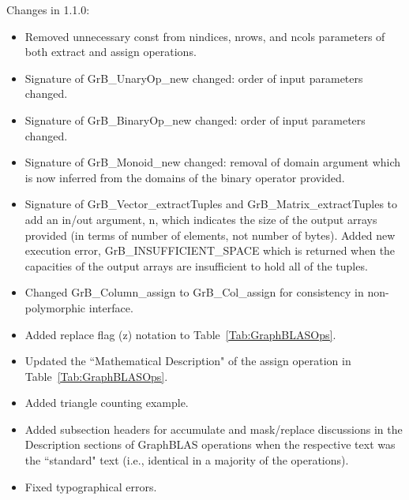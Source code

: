 Changes in 1.1.0:
\begin{itemize}
\item Removed unnecessary {\sf const} from {\sf nindices}, {\sf nrows}, and {\sf ncols} parameters of both {\sf extract} and {\sf assign} operations.
\item Signature of {\sf GrB\_UnaryOp\_new} changed: order of input parameters changed.
\item Signature of {\sf GrB\_BinaryOp\_new} changed: order of input parameters changed.
\item Signature of {\sf GrB\_Monoid\_new} changed: removal of domain argument which is now inferred from the domains of the binary operator provided.
\item Signature of {\sf GrB\_Vector\_extractTuples} and {\sf GrB\_Matrix\_extractTuples} to add an in/out argument, {\sf n}, which indicates the size of the output arrays provided (in terms of number of elements, not number of bytes).  Added new execution error, {\sf GrB\_INSUFFICIENT\_SPACE} which is returned when the capacities of the output arrays are insufficient to hold all of the tuples.
\item Changed {\sf GrB\_Column\_assign} to {\sf GrB\_Col\_assign} for consistency in non-polymorphic interface.
\item Added replace flag (z) notation to Table~\ref{Tab:GraphBLASOps}.
\item Updated the ``Mathematical Description" of the assign operation in Table~\ref{Tab:GraphBLASOps}.
\item Added triangle counting example.
\item Added subsection headers for accumulate and mask/replace discussions in the Description sections of GraphBLAS operations when the respective text was the ``standard" text (i.e., identical in a majority of the operations).
\item Fixed typographical errors.
\end{itemize}  


